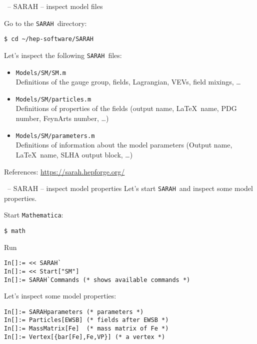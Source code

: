 \documentclass[11pt]{beamer}
\newcommand{\Mathematica}{\texttt{Mathematica}}
\newcommand{\SARAH}{\texttt{SARAH}}
\begin{document}
\begin{frame}[fragile]{\insertsection\ -- SARAH -- inspect model files}

  Go to the \SARAH\ directory:
  \begin{lstlisting}
$ cd ~/hep-software/SARAH\end{lstlisting}%
  Let's inspect the following \SARAH\ files:
  \begin{itemize}
  \item \texttt{Models/SM/SM.m}\\ Definitions of the gauge
    group, fields, Lagrangian, VEVs, field mixings, \ldots
  \item \texttt{Models/SM/particles.m}\\
    Definitions of properties of the fields (output name, \LaTeX\
    name, PDG number, FeynArts number, \ldots)
  \item \texttt{Models/SM/parameters.m}\\
    Definitions of information about the model parameters (Output
    name, \LaTeX\ name, SLHA output block, \ldots)
  \end{itemize}

  \bigskip

  References: \url{https://sarah.hepforge.org/}
\end{frame}


\begin{frame}[fragile]{\insertsection\ -- SARAH -- inspect model properties}
  Let's start \SARAH\ and inspect some model properties.

  \medskip

  Start \Mathematica:
  \begin{lstlisting}
$ math\end{lstlisting}%
  Run
  \begin{lstlisting}
In[]:= << SARAH`
In[]:= << Start["SM"]
In[]:= SARAH`Commands (* shows available commands *)\end{lstlisting}
  Let's inspect some model properties:
  \begin{lstlisting}
In[]:= SARAHparameters (* parameters *)
In[]:= Particles[EWSB] (* fields after EWSB *)
In[]:= MassMatrix[Fe]  (* mass matrix of Fe *)
In[]:= Vertex[{bar[Fe],Fe,VP}] (* a vertex *)\end{lstlisting}
\end{frame}
\end{document}
